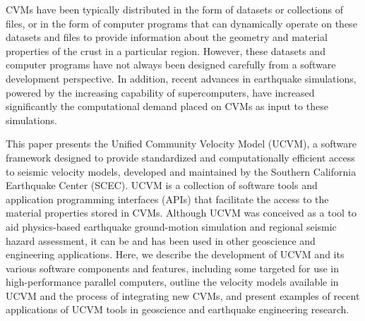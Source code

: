 CVMs have been typically distributed in the form of datasets or collections of files, or in the form of computer programs that can dynamically operate on these datasets and files to provide information about the geometry and material properties of the crust in a particular region. However, these datasets and computer programs have not always been designed carefully from a software development perspective. In addition, recent advances in earthquake simulations, powered by the increasing capability of supercomputers, have increased significantly the computational demand placed on CVMs as input to these simulations.

This paper presents the Unified Community Velocity Model (UCVM), a software framework designed to provide standardized and computationally efficient access to seismic velocity models, developed and maintained by the Southern California Earthquake Center (SCEC). UCVM is a collection of software tools and application programming interfaces (APIs) that facilitate the access to the material properties stored in CVMs. Although UCVM was conceived as a tool to aid physics-based earthquake ground-motion simulation and regional seismic hazard assessment, it can be and has been used in other geoscience and engineering applications. Here, we describe the development of UCVM and its various software components and features, including some targeted for use in high-performance parallel computers, outline the velocity models available in UCVM and the process of integrating new CVMs, and present examples of recent applications of UCVM tools in geoscience and earthquake engineering research.

